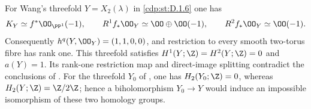 \begin{proposition}\hypertarget{tag-01FY}{}\label{cdp:st:D.1.13}


For Wang's threefold $Y=X_2(\lambda)$ in \ref{cdp:st:D.1.6} one has
\[
K_Y\simeq f^*\OO_{\PP^1}(-1),\qquad
R^1f_*\OO_Y\simeq\OO\oplus\OO(-1),\qquad
R^2f_*\OO_Y\simeq\OO(-1).
\]
Consequently $h^q(Y,\OO_Y)=(1,1,0,0)$, and restriction to every
smooth two-torus fibre has rank one. This threefold satisfies
$H^1(Y;\Z)=H^2(Y;\Z)=0$ and $a(Y)=1$. Its rank-one
restriction map and direct-image splitting contradict the conclusions of
\cite[Corollary~5.2 and Proposition~5.5, pp.~688--689]{CDP20}.
For the threefold $Y_0$ of , one has
$H_2(Y_0;\Z)=0$, whereas $H_2(Y;\Z)=\Z/2\Z$; hence a
biholomorphism $Y_0\to Y$ would induce an impossible isomorphism of
these two homology groups.
\end{proposition}


